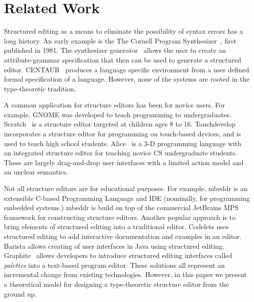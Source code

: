 \documentclass{llncs}
\begin{document}
\section{Related Work}\label{sec:rw}

Structured editing as a means to eliminate the possibility of syntax errors has a long history.  An early example is the
The Cornell Program Synthesizer~\cite{teitelbaum_cornell_1981}, first published in 1981.
The synthesizer generator~\cite{Reps:1984:SG:390010.808247} allows the user to create an attribute-grammar specification that then can be used to generate a structured editor. 
CENTAUR~\cite{Borras:1988:CS:64140.65005} produces a language specific environment from a user defined formal specification of a language.  However, none of the systems are rooted in the type-theoretic tradition.

A common application for structure editors has been for novice users. For example, 
GNOME\cite{garlan_gnome:_1984} was developed to teach programming to undergraduates.
Scratch~\cite{Resnick:2009:SP:1592761.1592779} is a structure editor targeted at children ages 8 to 16.
Touchdevelop \cite{tillmann_touchdevelop:_2011} incorporates a structure editor for programming on touch-based devices, and is used to teach high school students.
Alice~\cite{Conway:2000:ALL:332040.332481} is a 3-D programming language with an integrated structure editor for teaching novice CS undergraduate students. These are largely drag-and-drop user interfaces with a limited action model and an unclear semantics. 

Not all structure editors are for educational purposes. For example, 
mbeddr \cite{voelter_mbeddr:_2012} is an extensible C-based Programming Language and IDE (nominally, for programming embedded systems.) 
mbeddr is build on top of the commercial JetBrains MPS framework for constructing structure editors.
Another popular approach is to bring elements of structured editing into a traditional editor.
Codelets \cite{oney_codelets:_2012} uses structured editing to add interactive documentation and examples in an editor.
Barista\cite{ko_barista:_2006} allows creating of user interfaces in Java using structured editing.
Graphite~\cite{Omar:2012:ACC:2337223.2337324} allows developers to introduce structured editing interfaces called  \emph{palettes} into a text-based program editor.
These solutions all represent an incremental change from existing technologies.  However, in this paper we present a theoretical model for designing a type-theoretic structure editor from the ground up.
\end{document}
